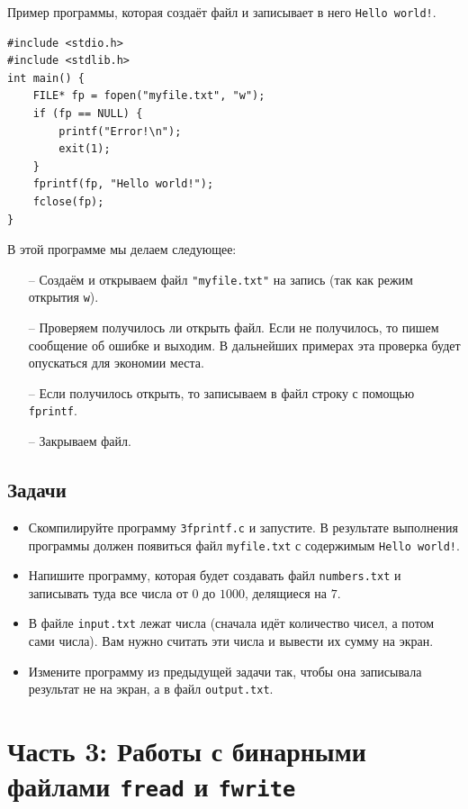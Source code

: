 \documentclass{article}
\begin{document}
Пример программы, которая создаёт файл и записывает в него \texttt{Hello world!}.
\begin{lstlisting}
#include <stdio.h>
#include <stdlib.h>
int main() {
    FILE* fp = fopen("myfile.txt", "w");
    if (fp == NULL) {
        printf("Error!\n");
        exit(1);
    }
    fprintf(fp, "Hello world!");
    fclose(fp);
}
\end{lstlisting}
В этой программе мы делаем следующее:
\begin{itemize}
\item[--] Создаём и открываем файл \texttt{"myfile.txt"} на запись (так как режим открытия \texttt{w}).
\item[--] Проверяем получилось ли открыть файл. Если не получилось, то пишем сообщение об ошибке и выходим.  В дальнейших примерах эта проверка будет опускаться для экономии места.
\item[--] Если получилось открыть, то записываем в файл строку с помощью \texttt{fprintf}.
\item[--] Закрываем файл.
\end{itemize}
 
\subsection*{Задачи}
\begin{itemize}
\item Скомпилируйте программу \texttt{3fprintf.c} и запустите. В результате выполнения программы должен появиться файл \texttt{myfile.txt} с содержимым \texttt{Hello world!}.

\item Напишите программу, которая будет создавать файл \texttt{numbers.txt} и записывать туда все числа от $0$ до $1000$, делящиеся на $7$.


\item В файле \texttt{input.txt} лежат числа (сначала идёт количество чисел, а потом сами числа). Вам нужно считать эти числа и вывести их сумму на экран.

\item Измените программу из предыдущей задачи так, чтобы она записывала результат не на экран, а в файл \texttt{output.txt}.
\end{itemize}


\newpage
\section*{Часть 3: Работы с бинарными файлами \texttt{fread} и \texttt{fwrite}}
\end{document}
